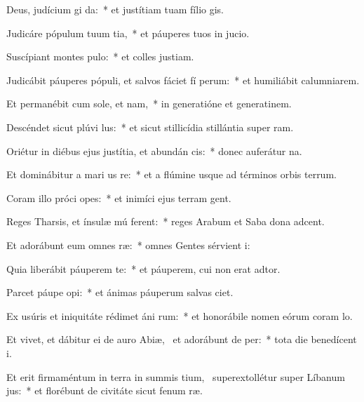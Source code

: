 \item Deus, judícium  gi da:~* et justítiam tuam fílio gis.
\item Judicáre pópulum tuum  tia,~* et páuperes tuos in jucio.
\item Suscípiant montes  pulo:~* et colles justiam.
\item Judicábit páuperes pópuli, et salvos fáciet fí perum:~* et humiliábit calumniarem.
\item Et permanébit cum sole, et  nam,~* in generatióne et generatinem.
\item Descéndet sicut plúvi  lus:~* et sicut stillicídia stillántia super ram.
\item Oriétur in diébus ejus justítia, et abundán cis:~* donec auferátur na.
\item Et dominábitur a mari us  re:~* et a flúmine usque ad términos orbis terrum.
\item Coram illo próci opes:~* et inimíci ejus terram gent.
\item Reges Tharsis, et ínsulæ mú ferent:~* reges Arabum et Saba dona adcent.
\item Et adorábunt eum omnes  ræ:~* omnes Gentes sérvient i:
\item Quia liberábit páuperem  te:~* et páuperem, cui non erat adtor.
\item Parcet páupe  opi:~* et ánimas páuperum salvas ciet.
\item Ex usúris et iniquitáte rédimet áni rum:~* et honorábile nomen eórum coram lo.
\item Et vivet, et dábitur ei de auro Abiæ,~\pscross{} et adorábunt de  per:~* tota die benedícent i.
\item Et erit firmaméntum in terra in summis tium,~\pscross{} superextollétur super Líbanum  jus:~* et florébunt de civitáte sicut fenum ræ.
